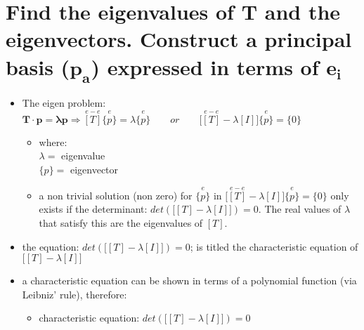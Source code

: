 \documentclass[10pt, letterpaper]{article}
\begin{document}
\section{Find the eigenvalues of $\bm{T}$ and the eigenvectors.  Construct a principal basis ($\bm{p_a}$) expressed in terms of 	$\bm{e_i}$}

	\begin{itemize}
		\item The eigen problem:  $\bm{T} \cdot \bm{p} = \bm{\lambda p} \Rightarrow
				\overset{e-e}{[T]} \overset{e}{\{p \}} = \lambda \overset{e}{\{p\}} \qquad	
				or \qquad \Big[ \overset{e-e}{ [T]} - \lambda [I] \Big] \overset{e}{\{p \}}  = \{0\}$
			\begin{itemize} 
				\item where: \\ $\lambda = $ eigenvalue \\ $\{p\} = $ eigenvector
				\item a non trivial solution (non zero) for $\overset{e}{\{p\}}$ in 
					$\Big[ \overset{e-e}{ [T]} - \lambda [I] \Big] \overset{e}{\{p \}}  = \{0\}$ only exists if the determinant:
					$det \left( \Big[ [T] - \lambda [I] \Big] \right) = 0$.  The real values of $\lambda$ that satisfy this 
					 are the eigenvalues of $[T]$.
			\end{itemize}
		\item the equation: $det \left( \Big[ [T] - \lambda [I] \Big] \right) = 0$; is titled the characteristic equation of 
			$\Big[ [T] - \lambda [I] \Big] $
		\item a characteristic equation can be shown in terms of a polynomial function (via Leibniz' rule), therefore:
			\begin{itemize}
				\item characteristic equation:  $det \left( \Big[ [T] - \lambda [I] \Big] \right) = 0$

\end{itemize}
\end{itemize}
\end{document}
